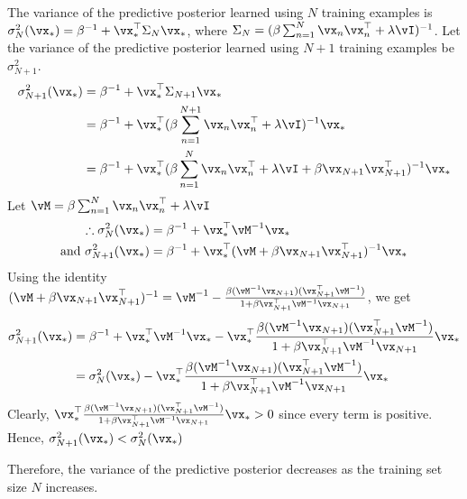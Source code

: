 \documentclass[a4paper,11pt]{article}
\begin{document}
\begin{pmisolution} 

The variance of the predictive posterior learned using $N$ training examples is $\sigma^2_N(\vx_*) = \beta^{-1} + \vx_*^\top\Sigma_N\vx_*$, where $\Sigma_N = (\beta\sum_{n=1}^{N}\vx_n\vx_n^\top + \lambda\vI)^{-1}$. Let the variance of the predictive posterior learned using $N+1$ training examples be $\sigma^2_{N+1}$.
\begin{equation*}
    \begin{split}
        \sigma^2_{N+1}(\vx_*) &= \beta^{-1} + \vx_*^\top\Sigma_{N+1}\vx_* \\
        &= \beta^{-1} + \vx_*^\top(\beta\sum_{n=1}^{N+1}\vx_n\vx_n^\top + \lambda\vI)^{-1}\vx_* \\
        &= \beta^{-1} + \vx_*^\top(\beta\sum_{n=1}^{N}\vx_n\vx_n^\top + \lambda\vI + \beta\vx_{N+1}\vx_{N+1}^\top)^{-1}\vx_* \\
    \end{split}
\end{equation*}
Let $\vM = \beta\sum_{n=1}^{N}\vx_n\vx_n^\top + \lambda\vI$
\begin{equation*}
    \begin{split}
    \therefore \sigma^2_{N}(\vx_*) &= \beta^{-1} + \vx_*^\top\vM^{-1}\vx_*\\
    \text{and } \sigma^2_{N+1}(\vx_*) &= \beta^{-1} + \vx_*^\top(\vM + \beta\vx_{N+1}\vx_{N+1}^\top)^{-1}\vx_*
    \end{split}
\end{equation*}
Using the identity $(\vM + \beta\vx_{N+1}\vx_{N+1}^\top)^{-1} = \vM^{-1} - \frac{\beta(\vM^{-1}\vx_{N+1})(\vx_{N+1}^\top\vM^{-1})}{1 + \beta\vx_{N+1}^\top\vM^{-1}\vx_{N+1}}$, we get
\begin{equation*}
    \begin{split}
        \sigma^2_{N+1}(\vx_*) &= \beta^{-1} + \vx_*^\top\vM^{-1}\vx_* - \vx_*^\top\frac{\beta(\vM^{-1}\vx_{N+1})(\vx_{N+1}^\top\vM^{-1})}{1 + \beta\vx_{N+1}^\top\vM^{-1}\vx_{N+1}}\vx_* \\ 
        &= \sigma^2_{N}(\vx_*) - \vx_*^\top\frac{\beta(\vM^{-1}\vx_{N+1})(\vx_{N+1}^\top\vM^{-1})}{1 + \beta\vx_{N+1}^\top\vM^{-1}\vx_{N+1}}\vx_*
    \end{split}
\end{equation*}
Clearly, $\vx_*^\top\frac{\beta(\vM^{-1}\vx_{N+1})(\vx_{N+1}^\top\vM^{-1})}{1 + \beta\vx_{N+1}^\top\vM^{-1}\vx_{N+1}}\vx_* > 0$ since every term is positive.\\ Hence, $\sigma^2_{N+1}(\vx_*) < \sigma^2_{N}(\vx_*)$

\noindent Therefore, the variance of the predictive posterior decreases as the training set size $N$ increases.
\end{pmisolution}
\end{document}
